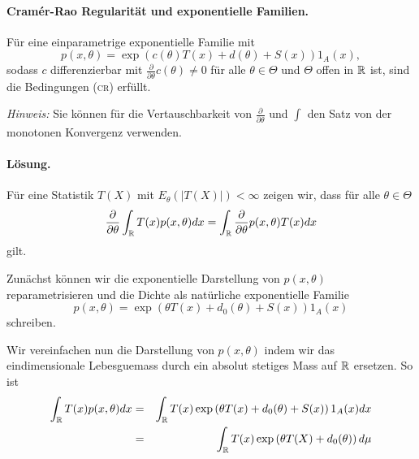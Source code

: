 \paragraph{Cram\'er-Rao Regularität und exponentielle Familien. }
Für eine einparametrige exponentielle Familie mit
\begin{equation}
	p(x, \theta) = \exp \left( c(\theta) T(x) + d(\theta) +S(x) \right)1_A(x),
\end{equation}
sodass $c$ differenzierbar mit $\frac{\partial}{\partial \theta} c(\theta)\neq 0$ 
für alle $\theta\in \Theta$ und $\Theta$ offen in $\mathbb R$ ist, sind die Bedingungen (\textsc{cr})
erfüllt.

\emph{Hinweis:} Sie können für die Vertauschbarkeit von $\frac{\partial}{\partial \theta}$ und $\int_{}^{}$
den Satz von der monotonen Konvergenz verwenden. 

\paragraph*{Lösung. }
Für eine Statistik $T(X)$ mit $E_\theta (|T(X)|) < \infty$ zeigen wir, dass für alle $\theta\in\Theta$
\begin{equation}
	\frac{\partial}{\partial \theta} \int_{\mathbb R}^{} T(x) p(x,\theta) dx = 
	\int_{\mathbb R}^{} \frac{\partial}{\partial \theta} p(x,\theta) T(x) dx
	\label{main-interchange}
\end{equation}
gilt.

Zunächst können wir die exponentielle Darstellung von $p(x,\theta)$
reparametrisieren und die Dichte als natürliche exponentielle Familie 
\begin{equation}
	p(x,\theta) = \exp \left( \theta T(x) + d_0(\theta) + S(x) \right)1_A(x)
\end{equation}
schreiben.

Wir vereinfachen nun die Darstellung von $p(x,\theta)$ indem wir das eindimensionale
Lebesguemass durch ein absolut stetiges Mass auf $\mathbb R$ ersetzen. So ist 
\begin{eqnarray}
	\int_{\mathbb R}^{} T(x) p(x,\theta) dx &=& 
	\int_{\mathbb R}^{} T(x) \exp \left( \theta T(x) + d_0(\theta) + S(x) \right)1_A(x) dx \\
	&=& \int_{\mathbb R}^{} T(x) \exp \left( \theta T(X) + d_0(\theta) \right) d\mu 
\end{eqnarray}

